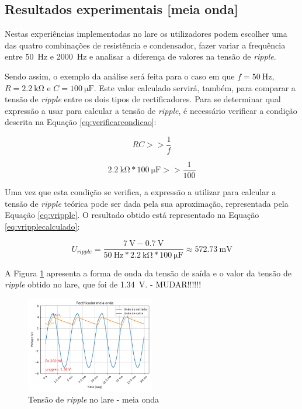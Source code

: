 \subsection{Resultados experimentais [meia onda]}
\label{sec:resultados_RectificadoresMeiaOnda}
Nestas experiências implementadas no \acrshort{lare} os utilizadores podem escolher uma das quatro combinações de resistência e condensador, fazer variar a frequência entre \SI{50}{\hertz} e \SI{2000}{\hertz} e analisar a diferença de valores na tensão de \textit{ripple}.

Sendo assim, o exemplo da análise será feita para o caso em que $f=\SI{50}{\hertz}$, $R=\SI{2.2}{\kilo\ohm}$ e $C=\SI{100}{\micro\farad}$. Este valor calculado servirá, também, para comparar a tensão de \textit{ripple} entre os dois tipos de rectificadores. Para se determinar qual expressão a usar para calcular a tensão de \textit{ripple}, é necessário verificar a condição descrita na Equação \ref{eq:verificarcondicao}:

\begin{equation} \label{eq:verificarcondicao}
	RC >> \dfrac{1}{f}
\end{equation}

\begin{equation}
	\SI{2.2}{\kilo\ohm} * \SI{100}{\micro\farad} >> \dfrac{1}{100}
\end{equation}

Uma vez que esta condição se verifica, a expressão a utilizar para calcular a tensão de \textit{ripple} teórica pode ser dada pela sua aproximação, representada pela Equação \ref{eq:vripple}. O resultado obtido está representado na Equação \ref{eq:vripplecalculado}:

\begin{equation} \label{eq:vripplecalculado}
	U_{ripple} = \frac{\SI{7}{\volt}-\SI{0.7}{\volt}}{\SI{50}{\hertz}*\SI{2.2}{\kilo\ohm}*\SI{100}{\micro\farad}} \approx \SI{572.73}{\milli\volt}
\end{equation}

A Figura \ref{fig:ripplelaremeiaonda} apresenta a forma de onda da tensão de saída e o valor da tensão de \textit{ripple} obtido no \acrshort{lare}, que foi de \SI{1.34}{\volt}. - MUDAR!!!!!!

\begin{figure}[hbtp]
	\centering
	\includegraphics[width=0.5\textwidth]{figures/resultados_LaRE_meia_onda.png}
	\caption{Tensão de \textit{ripple} no \acrshort{lare} - meia onda}
	\label{fig:ripplelaremeiaonda}
\end{figure}


